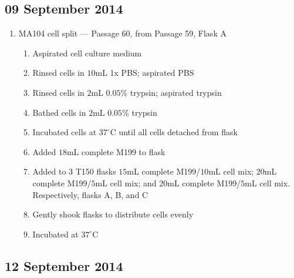 
\subsection*{09 September 2014}

\begin{enumerate}
	\item MA104 cell split --- Passage 60, from Passage 59, Flask A
		\begin{enumerate}
			\item Aspirated cell culture medium
			\item Rinsed cells in $10$mL 1x PBS; aspirated PBS
			\item Rinsed cells in $2$mL $0.05$\% trypsin; aspirated trypsin
			\item Bathed cells in $2$mL $0.05$\% trypsin
			\item Incubated cells at $37^{\circ}$C until all cells detached from flask
			\item Added $18$mL complete M199 to flask
			\item Added to $3$ T150 flasks $15$mL complete M199/$10$mL cell mix; $20$mL complete M199/$5$mL cell mix; and $20$mL complete M199/$5$mL cell mix. Respectively, flasks A, B, and C
			\item Gently shook flasks to distribute cells evenly
			\item Incubated at $37^{\circ}$C
		\end{enumerate}
\end{enumerate}

\subsection*{12 September 2014}

